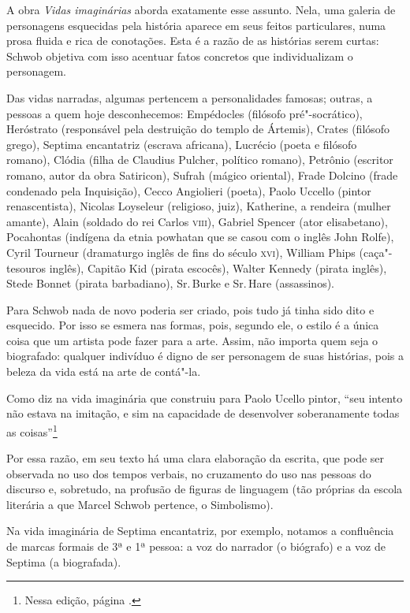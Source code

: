 A obra \textit{Vidas imaginárias} aborda exatamente esse assunto. Nela, uma
galeria de personagens esquecidas pela história aparece em seus feitos
particulares, numa prosa fluida e rica de conotações. Esta é a razão de
as histórias serem curtas: Schwob objetiva com isso acentuar fatos
concretos que individualizam o personagem.

Das vidas narradas, algumas pertencem a personalidades famosas; outras,
a pessoas a quem hoje desconhecemos: Empédocles (filósofo
pré"-socrático), Heróstrato (responsável pela destruição do templo de
Ártemis), Crates (filósofo grego), Septima encantatriz (escrava
africana), Lucrécio (poeta e filósofo romano), Clódia (filha de Claudius
Pulcher, político romano), Petrônio (escritor romano, autor da obra
Satiricon), Sufrah (mágico oriental), Frade Dolcino (frade condenado
pela Inquisição), Cecco Angiolieri (poeta), Paolo Uccello (pintor
renascentista), Nicolas Loyseleur (religioso, juiz), Katherine, a
rendeira (mulher amante), Alain (soldado do rei Carlos \textsc{viii}), Gabriel
Spencer (ator elisabetano), Pocahontas (indígena da etnia powhatan que
se casou com o inglês John Rolfe), Cyril Tourneur (dramaturgo inglês de
fins do século \textsc{xvi}), William Phips (caça"-tesouros inglês), Capitão Kid
(pirata escocês), Walter Kennedy (pirata inglês), Stede Bonnet (pirata
barbadiano), Sr.\,Burke e Sr.\,Hare (assassinos).

Para Schwob nada de novo poderia ser criado, pois tudo já tinha sido
dito e esquecido. Por isso se esmera nas formas, pois, segundo ele, o
estilo é a única coisa que um artista pode fazer para a arte. Assim, não
importa quem seja o biografado: qualquer indivíduo é digno de ser
personagem de suas histórias, pois a beleza da vida está na arte de
contá"-la.

Como diz na vida imaginária que construiu para Paolo Ucello pintor,
``seu intento não estava na imitação, e sim na capacidade de desenvolver
soberanamente todas as coisas''\footnote{Nessa edição, página \pageref{intento}.}

Por essa razão, em seu texto há uma clara elaboração da escrita, que
pode ser observada no uso dos tempos verbais, no cruzamento do uso nas
pessoas do discurso e, sobretudo, na profusão de figuras de linguagem
(tão próprias da escola literária a que Marcel Schwob pertence, o
Simbolismo).

Na vida imaginária de Septima encantatriz, por exemplo, notamos a
confluência de marcas formais de 3ª e 1ª pessoa: a voz do narrador (o
biógrafo) e a voz de Septima (a biografada).

